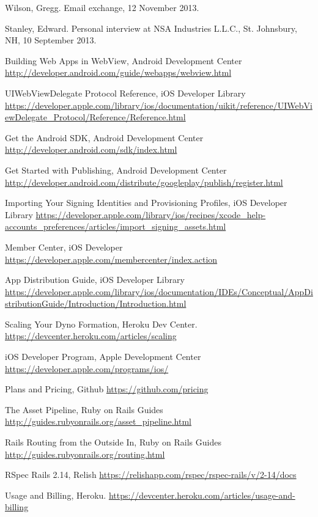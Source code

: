 \documentclass[12pt,letterpaper,titlepage]{article}
\begin{document}
\begin{thebibliography}{30}
 Wilson, Gregg. Email exchange, 12 November 2013.

 Stanley, Edward. Personal interview at NSA Industries L.L.C., St. Johnsbury, NH, 10 September 2013.

 Building Web Apps in WebView, Android Development Center \url{http://developer.android.com/guide/webapps/webview.html}

 UIWebViewDelegate Protocol Reference, iOS Developer Library \url{https://developer.apple.com/library/ios/documentation/uikit/reference/UIWebViewDelegate\_Protocol/Reference/Reference.html}

 Get the Android SDK, Android Development Center \url{http://developer.android.com/sdk/index.html}

 Get Started with Publishing, Android Development Center \url{http://developer.android.com/distribute/googleplay/publish/register.html}

 Importing Your Signing Identities and Provisioning Profiles, iOS Developer Library \url{https://developer.apple.com/library/ios/recipes/xcode\_help-accounts\_preferences/articles/import\_signing\_assets.html}

 Member Center, iOS Developer \url{https://developer.apple.com/membercenter/index.action}

 App Distribution Guide, iOS Developer Library \url{https://developer.apple.com/library/ios/documentation/IDEs/Conceptual/AppDistributionGuide/Introduction/Introduction.html}

 Scaling Your Dyno Formation, Heroku Dev Center. \url{https://devcenter.heroku.com/articles/scaling}

 iOS Developer Program, Apple Development Center \url{https://developer.apple.com/programs/ios/}

 Plans and Pricing, Github \url{https://github.com/pricing}

 The Asset Pipeline, Ruby on Rails Guides \url{http://guides.rubyonrails.org/asset\_pipeline.html}

 Rails Routing from the Outside In, Ruby on Rails Guides \url{http://guides.rubyonrails.org/routing.html}

 RSpec Rails 2.14, Relish \url{https://relishapp.com/rspec/rspec-rails/v/2-14/docs}

 Usage and Billing, Heroku. \url{https://devcenter.heroku.com/articles/usage-and-billing}

\end{thebibliography}
\end{document}
